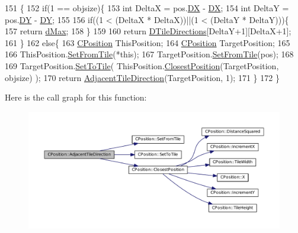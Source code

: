 \begin{DoxyCode}
151                                                                                   \{
152     \textcolor{keywordflow}{if}(1 == objsize)\{
153         \textcolor{keywordtype}{int} DeltaX = pos.\hyperlink{classCPosition_a28445f9b872169715919074d82044eda}{DX} - \hyperlink{classCPosition_a28445f9b872169715919074d82044eda}{DX};
154         \textcolor{keywordtype}{int} DeltaY = pos.\hyperlink{classCPosition_a84139c9e8eb547e7cf3cb851739943a4}{DY} - \hyperlink{classCPosition_a84139c9e8eb547e7cf3cb851739943a4}{DY};
155         
156         \textcolor{keywordflow}{if}((1 < (DeltaX * DeltaX))||(1 < (DeltaY * DeltaY)))\{
157             \textcolor{keywordflow}{return} \hyperlink{GameDataTypes_8h_acb2b033915f6659a71a38b5aa6e4eb42af6546049275557ce0ade2ceee042a319}{dMax};   
158         \}
159         
160         \textcolor{keywordflow}{return} \hyperlink{classCPosition_ab4bc566d2d14d378cfdf6b1d2d3f522e}{DTileDirections}[DeltaY+1][DeltaX+1];
161     \}
162     \textcolor{keywordflow}{else}\{
163          \hyperlink{classCPosition}{CPosition} ThisPosition;
164          \hyperlink{classCPosition}{CPosition} TargetPosition;
165          
166          ThisPosition.\hyperlink{classCPosition_a46994e6a8b8e3b4237edd7259ad844b6}{SetFromTile}(*\textcolor{keyword}{this});
167          TargetPosition.\hyperlink{classCPosition_a46994e6a8b8e3b4237edd7259ad844b6}{SetFromTile}(pos);
168          
169          TargetPosition.\hyperlink{classCPosition_ae302aa21792de64c97de29e2cbbfeb94}{SetToTile}( ThisPosition.\hyperlink{classCPosition_a91fd43eeb2c894bcb7577ae87247b726}{ClosestPosition}(TargetPosition, 
      objsize) );
170          \textcolor{keywordflow}{return} \hyperlink{classCPosition_a2295901e4c35cfc81304f9a217e34ac7}{AdjacentTileDirection}(TargetPosition, 1);
171     \}
172 \}
\end{DoxyCode}
Here is the call graph for this function\+:\nopagebreak
\begin{figure}[H]
\begin{center}
\leavevmode
\includegraphics[width=350pt]{classCPosition_a2295901e4c35cfc81304f9a217e34ac7_cgraph}
\end{center}
\end{figure}
